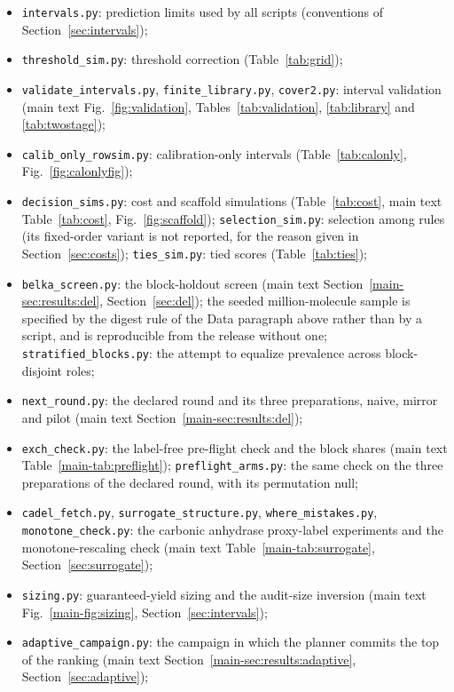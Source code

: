 \documentclass[10pt]{article}
\begin{document}
\begin{itemize}
\item \texttt{intervals.py}: prediction limits used by all scripts (conventions of Section~\ref{sec:intervals});
\item \texttt{threshold\_sim.py}: threshold correction (Table~\ref{tab:grid});
\item \texttt{validate\_intervals.py}, \texttt{finite\_library.py}, \texttt{cover2.py}: interval validation (main text Fig.~\ref{fig:validation}, Tables~\ref{tab:validation}, \ref{tab:library} and \ref{tab:twostage});
\item \texttt{calib\_only\_rowsim.py}: calibration-only intervals (Table~\ref{tab:calonly}, Fig.~\ref{fig:calonlyfig});
\item \texttt{decision\_sims.py}: cost and scaffold simulations (Table~\ref{tab:cost}, main text Table~\ref{tab:cost}, Fig.~\ref{fig:scaffold}); \texttt{selection\_sim.py}: selection among rules (its fixed-order variant is not reported, for the reason given in Section~\ref{sec:costs}); \texttt{ties\_sim.py}: tied scores (Table~\ref{tab:ties});
\item \texttt{belka\_screen.py}: the block-holdout screen (main text Section~\ref{main-sec:results:del}, Section~\ref{sec:del}); the seeded million-molecule sample is specified by the digest rule of the Data paragraph above rather than by a script, and is reproducible from the release without one; \texttt{stratified\_blocks.py}: the attempt to equalize prevalence across block-disjoint roles;
\item \texttt{next\_round.py}: the declared round and its three preparations, naive, mirror and pilot (main text Section~\ref{main-sec:results:del});
\item \texttt{exch\_check.py}: the label-free pre-flight check and the block shares (main text Table~\ref{main-tab:preflight}); \texttt{preflight\_arms.py}: the same check on the three preparations of the declared round, with its permutation null;
\item \texttt{cadel\_fetch.py}, \texttt{surrogate\_structure.py}, \texttt{where\_mistakes.py}, \texttt{monotone\_check.py}: the carbonic anhydrase proxy-label experiments and the monotone-rescaling check (main text Table~\ref{main-tab:surrogate}, Section~\ref{sec:surrogate});
\item \texttt{sizing.py}: guaranteed-yield sizing and the audit-size inversion (main text Fig.~\ref{main-fig:sizing}, Section~\ref{sec:intervals});
\item \texttt{adaptive\_campaign.py}: the campaign in which the planner commits the top of the ranking (main text Section~\ref{main-sec:results:adaptive}, Section~\ref{sec:adaptive});

\end{itemize}
\end{document}
